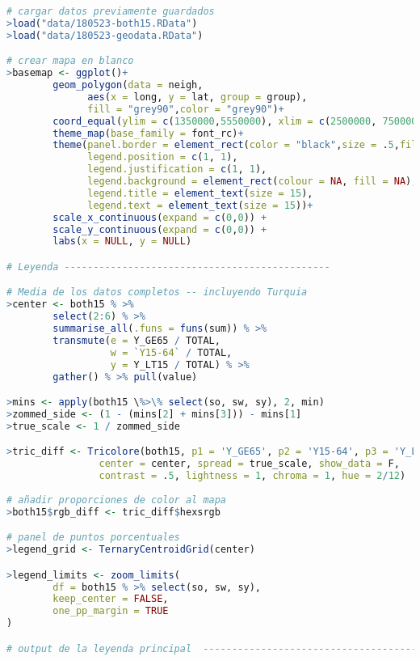 \begin{lstlisting}[language=R, caption=C\'odigo 2 con la construcci\'on del mapa]
# cargar datos previamente guardados
>load("data/180523-both15.RData")
>load("data/180523-geodata.RData")

# crear mapa en blanco
>basemap <- ggplot()+
        geom_polygon(data = neigh,
              aes(x = long, y = lat, group = group),
              fill = "grey90",color = "grey90")+
        coord_equal(ylim = c(1350000,5550000), xlim = c(2500000, 7500000))+
        theme_map(base_family = font_rc)+
        theme(panel.border = element_rect(color = "black",size = .5,fill = NA),
              legend.position = c(1, 1),
              legend.justification = c(1, 1),
              legend.background = element_rect(colour = NA, fill = NA),
              legend.title = element_text(size = 15),
              legend.text = element_text(size = 15))+
        scale_x_continuous(expand = c(0,0)) +
        scale_y_continuous(expand = c(0,0)) +
        labs(x = NULL, y = NULL) 

# Leyenda ----------------------------------------------

# Media de los datos completos -- incluyendo Turquia
>center <- both15 % >% 
        select(2:6) % >% 
        summarise_all(.funs = funs(sum)) % >% 
        transmute(e = Y_GE65 / TOTAL,
                  w = `Y15-64` / TOTAL,
                  y = Y_LT15 / TOTAL) % >% 
        gather() % >% pull(value)

>mins <- apply(both15 \%>\% select(so, sw, sy), 2, min)
>zommed_side <- (1 - (mins[2] + mins[3])) - mins[1]
>true_scale <- 1 / zommed_side

>tric_diff <- Tricolore(both15, p1 = 'Y_GE65', p2 = 'Y15-64', p3 = 'Y_LT15',
                center = center, spread = true_scale, show_data = F,
                contrast = .5, lightness = 1, chroma = 1, hue = 2/12)
                       
# añadir proporciones de color al mapa
>both15$rgb_diff <- tric_diff$hexsrgb

# panel de puntos porcentuales
>legend_grid <- TernaryCentroidGrid(center)

>legend_limits <- zoom_limits(
        df = both15 % >% select(so, sw, sy),
        keep_center = FALSE,
        one_pp_margin = TRUE
) 

# output de la leyenda principal  --------------------------------------------


\end{lstlisting}

